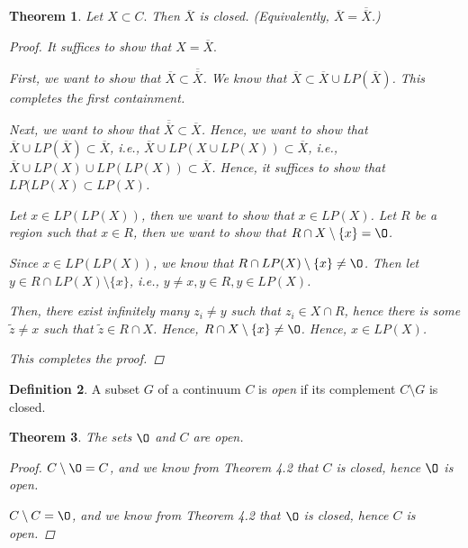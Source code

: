 \documentclass[11pt]{article}
\renewcommand{\emptyset}{\O}
\renewcommand{\_}[1]{\underline{ #1 }}
\newtheorem{theorem}{Theorem}[section]
\theoremstyle{definition}
\newtheorem{definition}[theorem]{Definition}
\numberwithin{equation}{subsection}
\begin{document}
\begin{theorem}  Let $X \subset C.$ Then $\overline{X}$ is closed. (Equivalently, $\overline{X} = \overline{\overline{X}}$.)
\begin{proof}

It suffices to show that $X = \overline{X}.$ 

First, we want to show that $\overline{X} \subset \overline{\overline{X}}$. We know that $\overline{X} \subset \overline{X} \cup LP(\overline{X})$. This completes the first containment.

Next, we want to show that $\overline{\overline{X}} \subset \overline{X}$. Hence, we want to show that $\overline{X} \cup LP(\overline{X}) \subset \overline{X}$, i.e., $\overline{X} \cup LP(X \cup LP(X)) \subset \overline{X}$, i.e., $\overline{X} \cup LP(X) \cup LP(LP(X)) \subset \overline{X}$. Hence, it suffices to show that $LP(LP(X) \subset LP(X)$.

Let $x \in LP(LP(X))$, then we want to show that $x \in LP(X)$. Let $R$ be a region such that $x \in R$, then we want to show that $R \cap X \setminus \{x\} = \emptyset$. 

Since $x \in LP(LP(X))$, we know that $R \cap LP(X) \setminus \{x\} \not = \emptyset$. Then let $y \in R \cap LP(X) \setminus \{x\}$, i.e., $y \not = x, y \in R, y \in LP(X)$.

Then, there exist infinitely many $z_i \not = y$ such that $z_i \in X\cap R$, hence there is some $\tilde{z} \not = x$ such that $\tilde{z} \in R \cap X$. Hence, $R \cap X \setminus\{x\} \not= \emptyset$. Hence, $x \in LP(X)$.

This completes the proof.


\renewcommand\qedsymbol{QED}
\end{proof}
\end{theorem}




\begin{definition}  A subset $G$ of a continuum $C$ is \emph{open} if its complement $C \setminus G$ is closed.
\end{definition}

\begin{theorem}\label{fortop1}  The sets $\emptyset$ and $C$ are open.
\begin{proof}
$C \setminus \emptyset = C$, and we know from Theorem 4.2 that $C$ is closed, hence $\emptyset$ is open.

$C \setminus C = \emptyset$, and we know from Theorem 4.2 that $\emptyset$ is closed, hence $C$ is open.

\renewcommand\qedsymbol{QED}
\end{proof}
\end{theorem}
\end{document}
